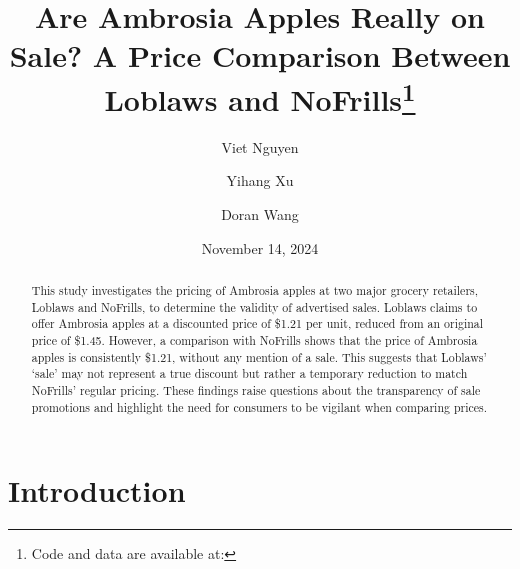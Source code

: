 \documentclass[
  letterpaper,
  DIV=11,
  numbers=noendperiod]{scrartcl}
\title{Are Ambrosia Apples Really on Sale? A Price Comparison Between
Loblaws and NoFrills\thanks{Code and data are available at:}}
\author{Viet Nguyen \and Yihang Xu \and Doran Wang}
\date{November 14, 2024}
\renewcommand*\contentsname{Table of contents}
\newcommand\contentsname{Table of contents}
\begin{document}
\maketitle
\begin{abstract}
This study investigates the pricing of Ambrosia apples at two major
grocery retailers, Loblaws and NoFrills, to determine the validity of
advertised sales. Loblaws claims to offer Ambrosia apples at a
discounted price of \$1.21 per unit, reduced from an original price of
\$1.45. However, a comparison with NoFrills shows that the price of
Ambrosia apples is consistently \$1.21, without any mention of a sale.
This suggests that Loblaws' `sale' may not represent a true discount but
rather a temporary reduction to match NoFrills' regular pricing. These
findings raise questions about the transparency of sale promotions and
highlight the need for consumers to be vigilant when comparing prices.
\end{abstract}

\renewcommand*\contentsname{Table of Contents}
{
\hypersetup{linkcolor=}
\setcounter{tocdepth}{3}
\tableofcontents
}

\section{Introduction}\label{introduction}
\end{document}
